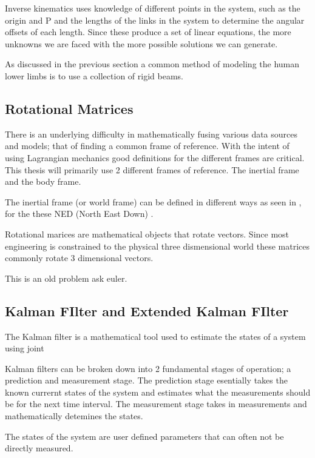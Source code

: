 Inverse kinematics uses knowledge of different points in the system, such as the origin and P and the lengths of the links in the system to determine the angular offsets of each length. Since these produce a set of linear equations, the more unknowns we are faced with the more possible solutions we can generate.

As discussed in the previous section a common method of modeling the human lower limbs is to use a collection of rigid beams. 


\subsection{Rotational Matrices}
There is an underlying difficulty in mathematically fusing various data sources and models; that of finding a common frame of reference. With the intent of using Lagrangian mechanics good definitions for the different frames are critical. This thesis will primarily use 2 different frames of reference. The inertial frame and the body frame.

The inertial frame (or world frame) can be defined in different ways as seen in \cite{soechting1992moving}, for the these NED (North East Down)	.

Rotational marices are mathematical objects that rotate vectors.
Since most engineering is constrained to the physical three dismensional world these matrices commonly rotate 3 dimensional vectors. 

This is an old problem ask euler.











\subsection{Kalman FIlter and Extended Kalman FIlter}
The Kalman filter is a mathematical tool used to estimate the states of a system using joint 

Kalman filters can be broken down into 2 fundamental stages of operation; a prediction and measurement stage. The prediction stage esentially takes the known currernt states of the system and estimates what the measurements should be for the next time interval. The measurement stage takes in measurements and mathematically detemines the states.

The states of the system are user defined parameters that can often not be directly measured.

